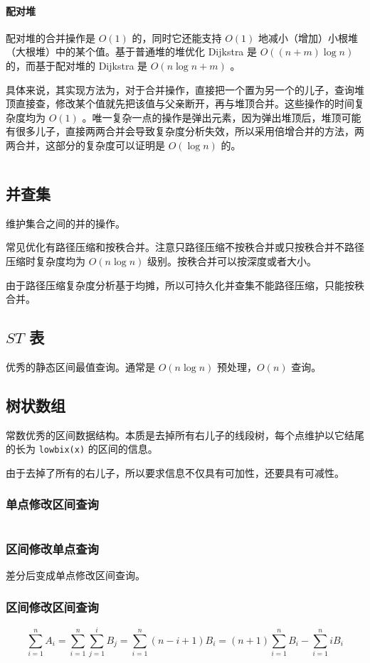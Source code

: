 \documentclass[UTF-8]{ctexart}
\newcommand{\cpp}[1]{\inputminted[bgcolor=bg,breaklines,breakanywhere=true]{c++}{#1}}
\begin{document}
				\paragraph{配对堆} 配对堆的合并操作是 $O(1)$ 的，同时它还能支持 $O(1)$ 地减小（增加）小根堆（大根堆）中的某个值。基于普通堆的堆优化 Dijkstra 是 $O((n+m)\log n)$ 的，而基于配对堆的 Dijkstra 是 $O(n\log n+m)$ 。
				
				具体来说，其实现方法为，对于合并操作，直接把一个置为另一个的儿子，查询堆顶直接查，修改某个值就先把该值与父亲断开，再与堆顶合并。这些操作的时间复杂度均为 $O(1)$ 。唯一复杂一点的操作是弹出元素，因为弹出堆顶后，堆顶可能有很多儿子，直接两两合并会导致复杂度分析失效，所以采用倍增合并的方法，两两合并，这部分的复杂度可以证明是 $O(\log n)$ 的。
				\cpp{code//DataStruct//pairheap.cpp}
				
		\subsection{并查集}
		维护集合之间的并的操作。
	
		常见优化有路径压缩和按秩合并。注意只路径压缩不按秩合并或只按秩合并不路径压缩时复杂度均为 $O(n\log n)$ 级别。按秩合并可以按深度或者大小。
	
		由于路径压缩复杂度分析基于均摊，所以可持久化并查集不能路径压缩，只能按秩合并。
		\subsection{$ST$ 表}
		优秀的静态区间最值查询。通常是 $O(n\log n)$ 预处理，$O(n)$ 查询。
		\subsection{树状数组}
		常数优秀的区间数据结构。本质是去掉所有右儿子的线段树，每个点维护以它结尾的长为 \texttt{lowbix(x)} 的区间的信息。
	
		由于去掉了所有的右儿子，所以要求信息不仅具有可加性，还要具有可减性。
			\subsubsection{单点修改区间查询}
			\cpp{code//DataStruct//fenwickbase.cpp}
			\subsubsection{区间修改单点查询}
			差分后变成单点修改区间查询。
			\subsubsection{区间修改区间查询}
			$$\sum_{i=1}^{n} A_i=\sum_{i=1}^n \sum_{j=1}^i B_j=\sum_{i=1}^n (n-i+1)B_i=(n+1)\sum_{i=1}^n B_i-\sum_{i=1}^n iB_i$$
	
\end{document}
